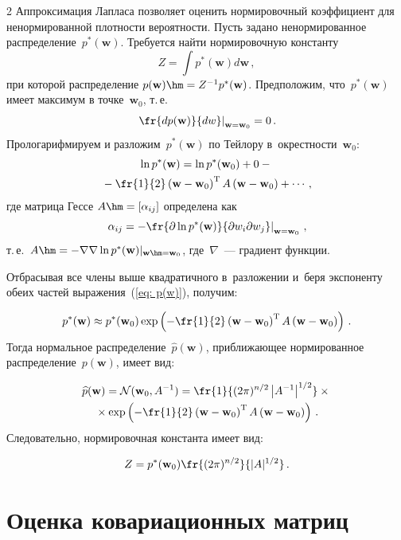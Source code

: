 \begin{multicols}{2}
Аппроксимация Лапласа позволяет оценить нормировочный коэффициент для ненормированной 
плот\-ности вероятности. Пусть задано ненормированное распределение~$p^{*}(\mathbf{w})$. 
Требуется найти нормировочную константу
$$
Z=\int p^{*}\left(\mathbf{w}\right) d\mathbf{w}\,,
$$
при которой распределение $p(\mathbf{w})\hm=Z^{-1}p^{*}(\mathbf{w})$. 
Предположим, что~$p^{*}(\mathbf{w})$ имеет максимум в точке~$\mathbf{w}_0$, т.\,е.\ 
$$
\left. \fr{d p(\mathbf{w})}{d w} \right|_{\mathbf{w}=\mathbf{w}_0}  = 0\,.
$$ 
Прологарифмируем и разложим~$p^{*}(\mathbf{w})$ по Тейлору в~окрестности~$\mathbf{w}_0$:
\begin{multline}
\label {eq: p(w)}
\ln p^{*}(\mathbf{w}) = \ln p^{*}(\mathbf{w}_0) + 0 -{}\\
{}- \fr{1}{2}\left(\mathbf{w}-
\mathbf{w}_0\right)^{\mathrm{T}}A\left(\mathbf{w}-\mathbf{w}_0\right) + \cdots\,,
\end{multline}
где матрица Гессе $A\hm=[\alpha_{ij}]$ определена как
$$
\left. \alpha_{ij}=-\fr{\partial \ln p^{*}(\mathbf{w})}{\partial w_{i}
\partial w_{j}} \right|_{\mathbf{w}=\mathbf{w}_0}\,,
$$ 
т.\,е.\ $A\hm=-\nabla\nabla \ln p^{*}(\mathbf{w})|_{\mathbf{w}\hm=\mathbf{w}_0}$, 
где~$\nabla$~--- градиент функции.

Отбрасывая все члены выше квадратичного в~разложении и~беря экспоненту обеих частей 
выражения~(\ref{eq: p(w)}), получим:

\noindent
$$
p^{*}(\mathbf{w})\approx p^{*}(\mathbf{w}_0)\exp \left( 
-\fr{1}{2}\left(\mathbf{w}-\mathbf{w}_0\right)^{\mathrm{T}}
A\left(\mathbf{w}-\mathbf{w}_0\right) \right)\,.
$$
Тогда нормальное распределение~$\widehat{p}(\mathbf{w})$, приближающее нормированное 
распределение~$p(\mathbf{w})$, имеет вид:

\noindent
\begin{multline*}
\widehat{p}(\mathbf{w}) = \mathcal{N}(\mathbf{w}_0,A^{-1}) = 
\fr{1}{(2\pi)^{{n}/{2}}\left\vert A^{-1}\right\vert^{{1}/{2}}}\times{}\\
{}\times
\exp\left( -\fr{1}{2}\left(\mathbf{w}-\mathbf{w}_0\right)^{\mathrm{T}}A
\left(\mathbf{w}-\mathbf{w}_0\right) \right)\,.
\end{multline*}
Следовательно, нормировочная константа имеет вид:

\noindent
\begin{equation*}
Z=p^{*}(\mathbf{w}_0)\fr{(2\pi)^{{n}/{2}}}{|A|^{{1}/{2}}}\,.
\end{equation*}


\section{Оценка ковариационных матриц}


\end{multicols}
